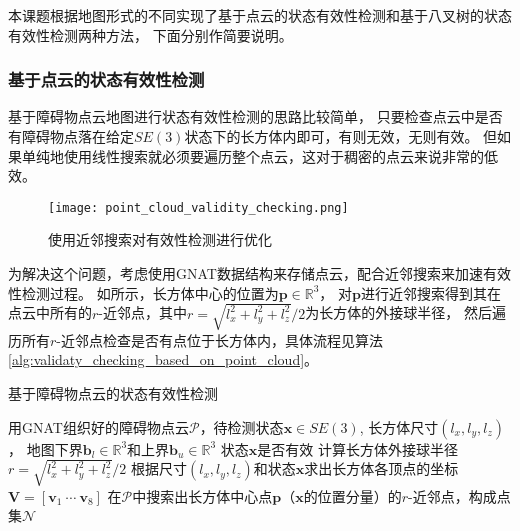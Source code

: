 本课题根据地图形式的不同实现了基于点云的状态有效性检测和基于八叉树的状态有效性检测两种方法，
下面分别作简要说明。

\subsubsection{基于点云的状态有效性检测}\label{subsubsec:vc_based_on_pcl}
基于障碍物点云地图进行状态有效性检测的思路比较简单，
只要检查点云中是否有障碍物点落在给定$SE(3)$状态下的长方体内即可，有则无效，无则有效。
但如果单纯地使用线性搜索就必须要遍历整个点云，这对于稠密的点云来说非常的低效。
\begin{figure}[ht]
  \centering
  \texttt{[image: point\_cloud\_validity\_checking.png]}
  \caption{使用近邻搜索对有效性检测进行优化}
  \label{fig:point_cloud_validaty_checking}
\end{figure}

为解决这个问题，考虑使用GNAT数据结构来存储点云，配合近邻搜索来加速有效性检测过程。
如所示，长方体中心的位置为$\bm{p} \in \mathbb{R}^3$，
对$\bm{p}$进行近邻搜索得到其在点云中所有的$r$-近邻点，其中$r=\sqrt{l_x^2+l_y^2+l_z^2}/2$为长方体的外接球半径，
然后遍历所有$r$-近邻点检查是否有点位于长方体内，具体流程见算法\ref{alg:validaty_checking_based_on_point_cloud}。
\begin{algorithm}
  \wuhao
  \caption{基于障碍物点云的状态有效性检测\label{alg:validaty_checking_based_on_point_cloud}}  
  \begin{algorithmic}[1] %
      \REQUIRE 用GNAT组织好的障碍物点云$\mathcal{P}$，待检测状态$\bm{x} \in SE(3)$, \newline
               长方体尺寸$(l_x, l_y, l_z)$，
               地图下界$\bm{b}_l \in \mathbb{R}^3$和上界$\bm{b}_u \in \mathbb{R}^3$
      \ENSURE 状态$\bm{x}$是否有效
      \STATE 计算长方体外接球半径$r=\sqrt{l_x^2+l_y^2+l_z^2}/2$
      \STATE 根据尺寸$(l_x, l_y, l_z)$和状态$\bm{x}$求出长方体各顶点的坐标$\bm{V}=[\bm{v}_1 \ \cdots \ \bm{v}_8]$
        \ENDIF
      \ENDFOR
      \STATE 在$\mathcal{P}$中搜索出长方体中心点$\bm{p}$（$\bm{x}$的位置分量）的$r$-近邻点，构成点集$\mathcal{N}$
        \ENDIF
      \ENDFOR
  \end{algorithmic}  
\end{algorithm} 

